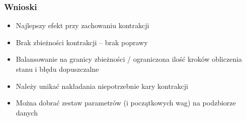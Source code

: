 \documentclass{beamer}
\begin{document}
\begin{frame}
\frametitle{Wnioski}
\begin{itemize}
	\item Najlepszy efekt przy zachowaniu kontrakcji
	\item Brak zbieżności kontrakcji – brak poprawy
	\item Balansowanie na granicy zbieżności / ograniczona ilość kroków obliczenia stanu i błędu dopuszczalne
	\item Należy unikać nakładania niepotrzebnie kary kontrakcji
	\item Można dobrać zestaw parametrów (i początkowych wag) na podzbiorze danych
\end{itemize}
\end{frame}
\end{document}
